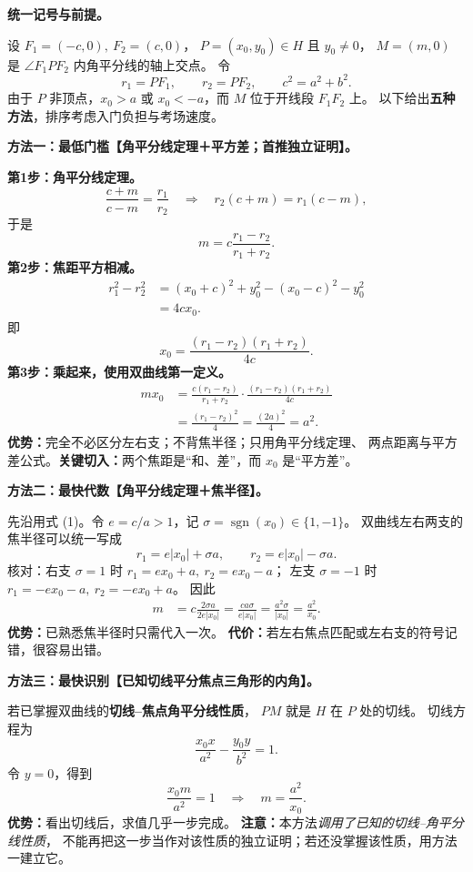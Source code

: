 \begin{proofbox}
\textbf{统一记号与前提。}

设 $F_1=(-c,0),\ F_2=(c,0)$，
$P=(x_0,y_0)\in H$ 且 $y_0\ne0$，
$M=(m,0)$ 是 $\angle F_1PF_2$ 内角平分线的轴上交点。
令
\[
r_1=PF_1,\qquad r_2=PF_2,\qquad c^2=a^2+b^2.
\]
由于 $P$ 非顶点，$x_0>a$ 或 $x_0<-a$，而 $M$ 位于开线段 $F_1F_2$ 上。
以下给出\textbf{五种方法}，排序考虑入门负担与考场速度。

\medskip
\textbf{方法一：最低门槛【角平分线定理＋平方差；首推独立证明】。}

\textbf{第1步：角平分线定理。}
\[
\frac{c+m}{c-m}=\frac{r_1}{r_2}
\quad\Longrightarrow\quad
r_2(c+m)=r_1(c-m),
\]
于是
\[
\boxed{m=c\frac{r_1-r_2}{r_1+r_2}}.\tag{1}
\]
\textbf{第2步：焦距平方相减。}
\[
\begin{aligned}
r_1^2-r_2^2
&=(x_0+c)^2+y_0^2-(x_0-c)^2-y_0^2\\
&=4cx_0.
\end{aligned}
\]
即
\[
\boxed{x_0=\frac{(r_1-r_2)(r_1+r_2)}{4c}}.\tag{2}
\]
\textbf{第3步：乘起来，使用双曲线第一定义。}
\[
\begin{aligned}
mx_0
&=\frac{c(r_1-r_2)}{r_1+r_2}
  \cdot\frac{(r_1-r_2)(r_1+r_2)}{4c}\\
&=\frac{(r_1-r_2)^2}{4}
=\frac{(2a)^2}{4}=\boxed{a^2}.
\end{aligned}
\]
\textbf{优势：}完全不必区分左右支；不背焦半径；只用角平分线定理、
两点距离与平方差公式。\textbf{关键切入：}两个焦距是“和、差”，而 $x_0$ 是“平方差”。

\medskip
\textbf{方法二：最快代数【角平分线定理＋焦半径】。}

先沿用式 (1)。令 $e=c/a>1$，记
$\sigma=\operatorname{sgn}(x_0)\in\{1,-1\}$。
双曲线左右两支的焦半径可以统一写成
\[
\boxed{r_1=e|x_0|+\sigma a,\qquad
r_2=e|x_0|-\sigma a}.
\]
核对：右支 $\sigma=1$ 时 $r_1=ex_0+a,\ r_2=ex_0-a$；
左支 $\sigma=-1$ 时 $r_1=-ex_0-a,\ r_2=-ex_0+a$。
因此
\[
\begin{aligned}
m
&=c\frac{2\sigma a}{2e|x_0|}
=\frac{ca\sigma}{e|x_0|}
=\frac{a^2\sigma}{|x_0|}
=\boxed{\frac{a^2}{x_0}}.
\end{aligned}
\]
\textbf{优势：}已熟悉焦半径时只需代入一次。
\textbf{代价：}若左右焦点匹配或左右支的符号记错，很容易出错。

\medskip
\textbf{方法三：最快识别【已知切线平分焦点三角形的内角】。}

若已掌握双曲线的\textbf{切线--焦点角平分线性质}，
$PM$ 就是 $H$ 在 $P$ 处的切线。
切线方程为
\[
\frac{x_0x}{a^2}-\frac{y_0y}{b^2}=1.
\]
令 $y=0$，得到
\[
\frac{x_0m}{a^2}=1
\quad\Longrightarrow\quad
\boxed{m=\frac{a^2}{x_0}}.
\]
\textbf{优势：}看出切线后，求值几乎一步完成。
\textbf{注意：}本方法\emph{调用了已知的切线--角平分线性质}，
不能再把这一步当作对该性质的独立证明；若还没掌握该性质，用方法一建立它。


\end{proofbox}
